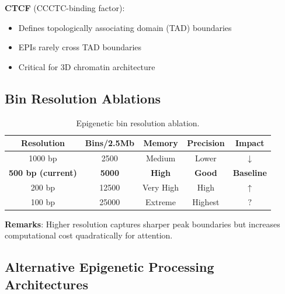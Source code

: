 \documentclass[11pt,a4paper]{article}
\begin{document}
\textbf{CTCF} (CCCTC-binding factor):
\begin{itemize}
    \item Defines topologically associating domain (TAD) boundaries
    \item EPIs rarely cross TAD boundaries
    \item Critical for 3D chromatin architecture
\end{itemize}

\subsection{Bin Resolution Ablations}

\begin{table}[H]
\centering
\begin{tabular}{ccccc}
\toprule
\textbf{Resolution} & \textbf{Bins/2.5Mb} & \textbf{Memory} & \textbf{Precision} & \textbf{Impact} \\
\midrule
1000 bp & 2500 & Medium & Lower & \textcolor{negative}{$\downarrow$} \\
\rowcolor{lightgray}
\textbf{500 bp (current)} & \textbf{5000} & \textbf{High} & \textbf{Good} & \textbf{Baseline} \\
200 bp & 12500 & Very High & High & \textcolor{positive}{$\uparrow$} \\
100 bp & 25000 & Extreme & Highest & \textcolor{uncertain}{$?$} \\
\bottomrule
\end{tabular}
\caption{Epigenetic bin resolution ablation.}
\end{table}

\textbf{Remarks}: Higher resolution captures sharper peak boundaries but increases computational cost quadratically for attention.

\subsection{Alternative Epigenetic Processing Architectures}
\end{document}
